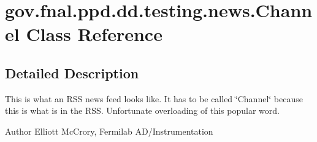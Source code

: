 \hypertarget{classgov_1_1fnal_1_1ppd_1_1dd_1_1testing_1_1news_1_1Channel}{\section{gov.\-fnal.\-ppd.\-dd.\-testing.\-news.\-Channel Class Reference}
\label{classgov_1_1fnal_1_1ppd_1_1dd_1_1testing_1_1news_1_1Channel}
}


\subsection{Detailed Description}
This is what an R\-S\-S news feed looks like. It has to be called \char`\"{}\-Channel\char`\"{} because this is what is in the R\-S\-S. Unfortunate overloading of this popular word.

\begin{DoxyAuthor}{Author}
Elliott Mc\-Crory, Fermilab A\-D/\-Instrumentation 
\end{DoxyAuthor}
